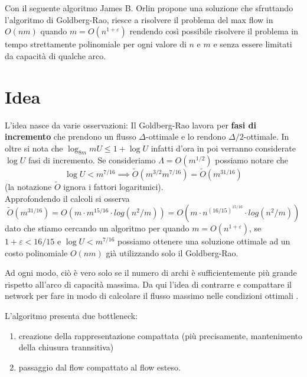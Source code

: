 \documentclass[a4paper, 11pt]{report}
\newcommand{\dlt}{$\Delta$}
\begin{document}
Con il seguente algoritmo James B. Orlin propone una soluzione che sfruttando l'algoritmo di Goldberg-Rao, riesce a risolvere il problema del max flow in $O(nm)$ quando $m = O(n^{1+\varepsilon})$ rendendo così possibile risolvere il problema in tempo strettamente polinomiale per ogni valore di $n$ e $m$ e senza essere limitati da capacità di qualche arco.

\section{Idea}
L'idea nasce da varie osservazioni:
Il Goldberg-Rao lavora per \textbf{fasi di incremento} che prendono un flusso \dlt-ottimale e lo rendono $\Delta/2$-ottimale. 
In oltre si nota che $\log_{8m} mU \le 1 + \log U$ infatti d'ora in poi verranno considerate $\log U$ fasi di incremento.
Se consideriamo $\Lambda = O(m^{1/2})$ possiamo notare che \[\log U < m^{7/16} \implies \tilde{O}(m^{3/2}m^{7/16}) = \tilde{O}(m^{31/16})\] 
(la notazione $\tilde{O}$ ignora i fattori logaritmici).\\
Approfondendo il calcoli si osserva 
\[\tilde{O}(m^{31/16}) = O(m\cdot m^{15/16}\cdot log(n^2/m)) = O(m\cdot n^{(16/15)^{15/16}}\cdot log(n^2/m)) \]
dato che stiamo cercando un algoritmo per quando $m = O(n^{1+\varepsilon})$, se $1+\varepsilon < 16/15$ e $\log U < m^{7/16}$ possiamo ottenere una soluzione ottimale ad un costo polinomiale $O(nm)$ già utilizzando solo il Goldberg-Rao.

Ad ogni modo, ciò è vero solo se il numero di archi è sufficientemente più grande rispetto all'arco di capacità massima.
Da qui l'idea di contrarre e compattare il network per fare in modo di calcolare il flusso massimo nelle condizioni ottimali . 

L'algoritmo presenta due bottleneck: 
\begin{enumerate}
    \item creazione della rappresentazione compattata (più precisamente, mantenimento della chiusura trannsitiva)
    \item passaggio dal flow compattato al flow esteso.
\end{enumerate}
\end{document}
